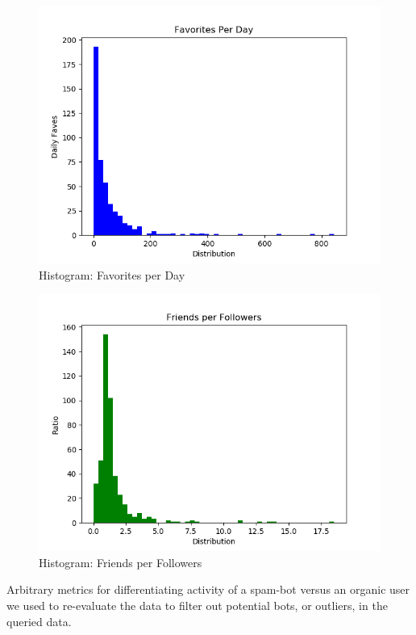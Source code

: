 \begin{figure}[!ht]
  \centering\includegraphics[width=\columnwidth]{images/faves_hist.png}
  \caption{Histogram: Favorites per Day}\label{f:faves-hist}
\end{figure}

\begin{figure}[!ht]
  \centering\includegraphics[width=\columnwidth]{images/ratio_hist.png}
  \caption{Histogram: Friends per Followers}\label{f:ratio-hist}
\end{figure}

Arbitrary metrics for differentiating activity of a spam-bot versus an organic
user we used to re-evaluate the data to filter out potential bots, or outliers,
in the queried data.

